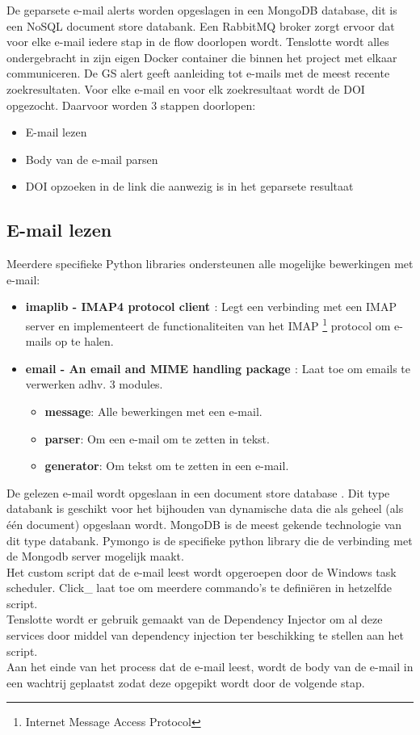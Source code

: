 \FloatBarrier
De geparsete e-mail alerts worden opgeslagen in een MongoDB database, dit is een NoSQL document store databank. Een RabbitMQ broker zorgt ervoor dat voor elke e-mail iedere stap in de flow doorlopen wordt. Tenslotte wordt alles ondergebracht in zijn eigen Docker container die binnen het project met elkaar communiceren.
De GS alert geeft aanleiding tot e-mails met de meest recente zoekresultaten. Voor elke e-mail en voor elk zoekresultaat wordt de DOI opgezocht. Daarvoor worden 3 stappen doorlopen:
\begin{itemize}
    \item E-mail lezen
    \item Body van de e-mail parsen
    \item DOI opzoeken in de link die aanwezig is in het geparsete resultaat
\end{itemize}
\subsection{E-mail lezen}
Meerdere specifieke Python libraries ondersteunen alle mogelijke bewerkingen met e-mail:
\begin{itemize}
    \item \textbf{imaplib - IMAP4 protocol client \autocite{Imaplib2025}}: Legt een verbinding met een IMAP server en implementeert de functionaliteiten van het IMAP \footnote{Internet Message Access Protocol} protocol om e-mails op te halen.\autocite{Imap2025}
    \item \textbf{email - An email and MIME handling package \autocite{Email2025}}: Laat toe om emails te verwerken adhv. 3 modules.
    \begin{itemize}
        \item \textbf{message}: Alle bewerkingen met een e-mail.
        \item \textbf{parser}: Om een e-mail om te zetten in tekst.
        \item \textbf{generator}: Om tekst om te zetten in een e-mail. 
    \end{itemize}
\end{itemize}
De gelezen e-mail wordt opgeslaan in een document store database \autocite{Documentstore2025}. Dit type databank is geschikt voor het bijhouden van dynamische data die als geheel (als één document) opgeslaan wordt. MongoDB \autocite{Mongodb2025} is de meest gekende technologie van dit type databank. Pymongo \autocite{Pymongo2025} is de specifieke python library die de verbinding met de Mongodb server mogelijk maakt.\\
Het custom script dat de e-mail leest wordt opgeroepen door de Windows task scheduler. Click\_ \autocite{Click2025} laat toe om meerdere commando's te definiëren in hetzelfde script.\\
Tenslotte wordt er gebruik gemaakt van de Dependency Injector \autocite{Dependencyinjector2025} om al deze services door middel van dependency injection \autocite{Di2025} ter beschikking te stellen aan het script.\\
Aan het einde van het process dat de e-mail leest, wordt de body van de e-mail in een wachtrij geplaatst zodat deze opgepikt wordt door de volgende stap.
